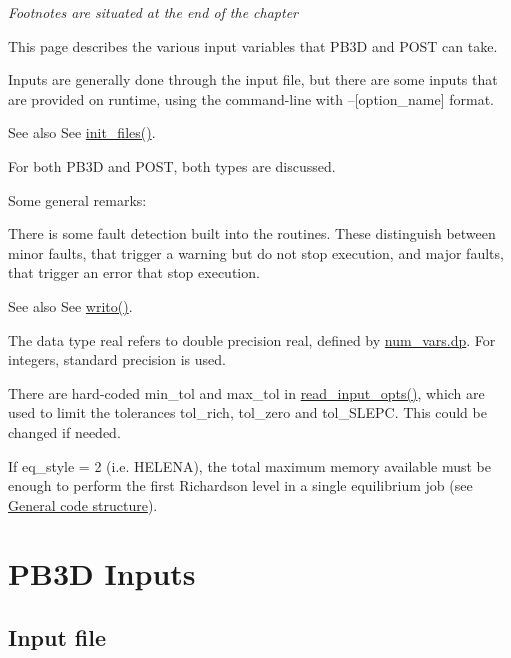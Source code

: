  
    \textit{\scriptsize Footnotes are situated at the end of the chapter}


This page describes the various input variables that P\+B3D and P\+O\+ST can take.

Inputs are generally done through the input file, but there are some inputs that are provided on runtime, using the command-\/line with {\ttfamily --\mbox{[}option\+\_\+name\mbox{]}} format. \begin{DoxySeeAlso}{See also}
See \hyperlink{namespacefiles__ops_a1e219b1147f109f758d03bef89d540e8}{init\+\_\+files()}.
\end{DoxySeeAlso}
For both P\+B3D and P\+O\+ST, both types are discussed.

Some general remarks\+:
\begin{DoxyItemize}
\item There is some fault detection built into the routines. These distinguish between minor faults, that trigger a warning but do not stop execution, and major faults, that trigger an error that stop execution. \begin{DoxySeeAlso}{See also}
See \hyperlink{namespacemessages_aa4a8d01563e92558e8a0875b075ec54c}{writo()}.
\end{DoxySeeAlso}

\item The data type {\ttfamily real} refers to double precision real, defined by \hyperlink{namespacenum__vars_a03802aa2bd86439d7a9370836fabf3f2}{num\+\_\+vars.\+dp}. For integers, standard precision is used.
\item There are hard-\/coded {\ttfamily min\+\_\+tol} and {\ttfamily max\+\_\+tol} in \hyperlink{namespaceinput__ops_a434acca4f59f9dc1d91e04f846133684}{read\+\_\+input\+\_\+opts()}, which are used to limit the tolerances {\ttfamily tol\+\_\+rich}, {\ttfamily tol\+\_\+zero} and {\ttfamily tol\+\_\+\+S\+L\+E\+PC}. This could be changed if needed.
\item If {\ttfamily eq\+\_\+style = 2} (i.\+e. H\+E\+L\+E\+NA), the total maximum memory available must be enough to perform the first Richardson level in a single equilibrium job (see \hyperlink{page_overview}{General code structure}).
\end{DoxyItemize}\hypertarget{page_inputs_inputs_PB3D}{}\section{P\+B3\+D Inputs}\label{page_inputs_inputs_PB3D}
\hypertarget{page_inputs_inputs_PB3D_file}{}\subsection{Input file}\label{page_inputs_inputs_PB3D_file}
